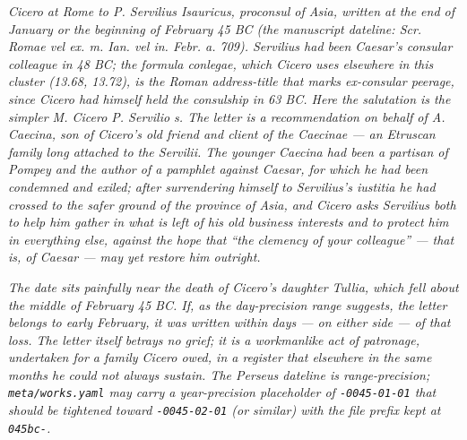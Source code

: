 
\textit{Cicero at Rome to P. Servilius Isauricus, proconsul of Asia,
written at the end of January or the beginning of February 45 BC
(the manuscript dateline: \textit{Scr. Romae vel ex. m. Ian. vel in.
Febr. a. 709}). Servilius had been Caesar's consular colleague in
48 BC; the formula \textit{conlegae}, which Cicero uses elsewhere
in this cluster (13.68, 13.72), is the Roman address-title that
marks ex-consular peerage, since Cicero had himself held the
consulship in 63 BC. Here the salutation is the simpler
\textit{M. Cicero P. Servilio s.} The letter is a recommendation
on behalf of A. Caecina, son of Cicero's old friend and client
of the Caecinae --- an Etruscan family long attached to the
Servilii. The younger Caecina had been a partisan of Pompey and
the author of a pamphlet against Caesar, for which he had been
condemned and exiled; after surrendering himself to Servilius's
\textit{iustitia} he had crossed to the safer ground of the
province of Asia, and Cicero asks Servilius both to help him
gather in what is left of his old business interests and to
protect him in everything else, against the hope that ``the
clemency of your colleague'' --- that is, of Caesar --- may yet
restore him outright.}

\textit{The date sits painfully near the death of Cicero's daughter
Tullia, which fell about the middle of February 45 BC. If, as the
day-precision range suggests, the letter belongs to early February,
it was written within days --- on either side --- of that loss. The
letter itself betrays no grief; it is a workmanlike act of
patronage, undertaken for a family Cicero owed, in a register that
elsewhere in the same months he could not always sustain. The
Perseus dateline is range-precision; \texttt{meta/works.yaml} may
carry a year-precision placeholder of \texttt{-0045-01-01} that
should be tightened toward \texttt{-0045-02-01} (or similar) with
the file prefix kept at \texttt{045bc-}.}

